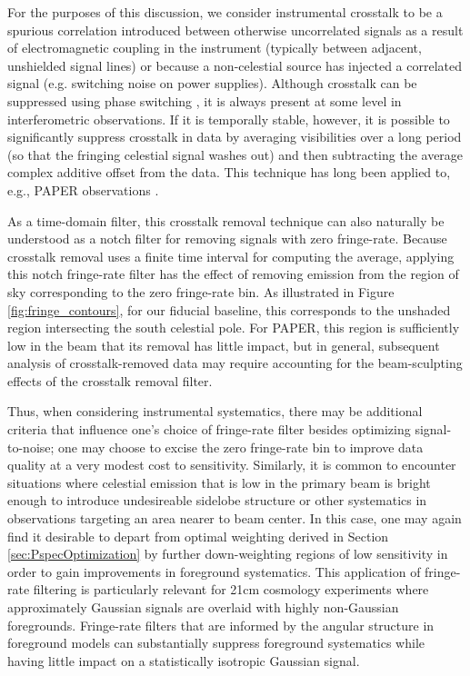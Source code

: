 \documentclass[twocolumn,apj,numberedappendix]{emulateapj}
\begin{document}
For the purposes of this discussion, we consider instrumental crosstalk to be a spurious 
correlation introduced between otherwise uncorrelated signals
as a result of electromagnetic coupling in the instrument (typically between adjacent, unshielded signal lines)
or because a non-celestial source has injected a correlated signal (e.g. switching noise on power supplies).
Although crosstalk can be suppressed using phase switching \citep{ryle1952}, it is always present at some level
in interferometric observations.  If it is temporally stable, however, it is possible to significantly
suppress crosstalk in data by averaging visibilities over a long period (so that the fringing celestial
signal washes out) and then subtracting the average complex additive offset from the data.  This 
technique has
long been applied to, e.g., PAPER observations \citep{parsons_et_al2010,pober_et_al2013,J14,P14,ali_et_al2015}.

As a time-domain filter, this crosstalk removal technique can also naturally be understood as a notch filter
for removing signals with zero fringe-rate.  Because crosstalk removal uses a finite time interval for computing
the average, applying this notch fringe-rate filter has the effect of removing emission from the region of
sky corresponding to the zero fringe-rate bin.  As illustrated in Figure \ref{fig:fringe_contours}, for our
fiducial baseline,
this corresponds to the unshaded region intersecting the south celestial pole.
For PAPER, this region is sufficiently low in the beam that its removal has little impact, but in general, 
subsequent analysis of crosstalk-removed data may require accounting for the beam-sculpting effects of
the crosstalk removal filter.

Thus, when considering instrumental systematics, there may be additional criteria that influence one's
choice of fringe-rate filter besides optimizing signal-to-noise; one may choose to excise the zero fringe-rate
bin to improve data quality at a very modest cost to sensitivity.  Similarly, it is common to encounter situations
where celestial emission that is low in the primary beam is bright enough to introduce undesireable 
sidelobe structure or other systematics in observations targeting an area nearer to beam center.  In this case,
one may again find it desirable to depart from optimal weighting derived in Section \ref{sec:PspecOptimization}
by further down-weighting regions of low sensitivity in order to gain improvements in foreground systematics.
This application of fringe-rate filtering is particularly relevant for 21cm cosmology experiments where approximately
Gaussian signals are overlaid with highly non-Gaussian foregrounds.  Fringe-rate filters that are informed by 
the angular structure in foreground models can substantially suppress foreground systematics while having little
impact on a statistically isotropic Gaussian signal.
\end{document}
